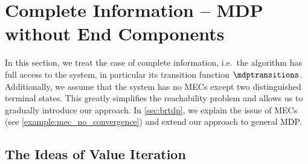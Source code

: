 \documentclass{article}
\begin{document}
 	\section{Complete Information -- MDP without End Components} \label{sec:brtdp_no_ec}

In this section, we treat the case of complete information, i.e.\ the algorithm has full access to the system, in particular its transition function $\mdptransitions$.
Additionally, we assume that the system has no MECs except two distinguished terminal states.
This greatly simplifies the reachability problem and allows us to gradually introduce our approach.
In \cref{sec:brtdp}, we explain the issue of MECs (see \cref{example:mec_no_convergence}) and extend our approach to general MDP.

\subsection{The Ideas of Value Iteration}
\end{document}
